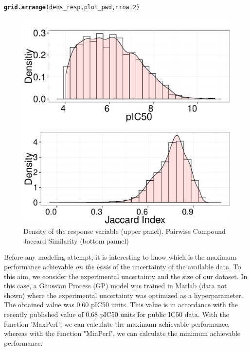 \documentclass[twoside,a4wide,12pt]{article}\usepackage[]{graphicx}\usepackage[]{color}
\makeatletter
\def\maxwidth{ %
  \ifdim\Gin@nat@width>\linewidth
    \linewidth
  \else
    \Gin@nat@width
  \fi
}
\newcommand{\hlnum}[1]{\textcolor[rgb]{0.686,0.059,0.569}{#1}}%
\newcommand{\hlstd}[1]{\textcolor[rgb]{0.345,0.345,0.345}{#1}}%
\newcommand{\hlkwc}[1]{\textcolor[rgb]{0.333,0.667,0.333}{#1}}%
\newcommand{\hlkwd}[1]{\textcolor[rgb]{0.737,0.353,0.396}{\textbf{#1}}}%
\newenvironment{kframe}{%
 \def\at@end@of@kframe{}%
 \ifinner\ifhmode%
  \def\at@end@of@kframe{\end{minipage}}%
  \begin{minipage}{\columnwidth}%
 \fi\fi%
 \def\FrameCommand##1{\hskip\@totalleftmargin \hskip-\fboxsep
 \colorbox{shadecolor}{##1}\hskip-\fboxsep
     \hskip-\linewidth \hskip-\@totalleftmargin \hskip\columnwidth}%
 \MakeFramed {\advance\hsize-\width
   \@totalleftmargin\z@ \linewidth\hsize
   \@setminipage}}%
 {\par\unskip\endMakeFramed%
 \at@end@of@kframe}
\newenvironment{knitrout}{}{} %
\makeatother
\begin{document}
\begin{knitrout}
\color{fgcolor}\begin{kframe}
\begin{alltt}
\hlkwd{grid.arrange}\hlstd{(dens_resp, plot_pwd,} \hlkwc{nrow} \hlstd{=} \hlnum{2}\hlstd{)}
\end{alltt}
\end{kframe}\begin{figure}[]


{\centering \includegraphics[width=\maxwidth]{figure/unnamed-chunk-25} 

}

\caption[Density of the response variable (upper panel)]{Density of the response variable (upper panel). Pairwise Compound Jaccard Similarity (bottom pannel)\label{fig:unnamed-chunk-25}}
\end{figure}


\end{knitrout}


Before any modeling attempt, it is interesting to know which is the maximum performance achievable {\it on the basis} of the uncertainty of the available data.\cite{cortesGP}
To this aim, we consider the experimental uncertainty and the size of our dataset. 
In this case, a Gaussian Process (GP) model was trained in Matlab (data not shown) where the experimental uncertainty was optimized as a hyperparameter. The obtained value was 0.60 pIC50 units.
This value is in accordance with the recently published value of 0.68 pIC50 units for public IC50 data.\cite{Kalliokoski2013}
With the function 'MaxPerf', we can calculate the maximum achievable performance, whereas with the function "MinPerf",
we can calculate the minimum achievable performance.
\end{document}
